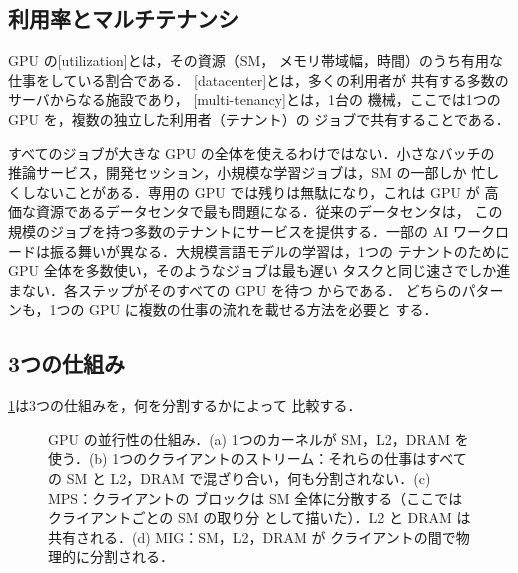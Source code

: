 \documentclass[../main.tex]{subfiles}
\begin{document}
\subsection{利用率とマルチテナンシ}

\begin{definition}
  GPU の[utilization]とは，その資源（SM，
  メモリ帯域幅，時間）のうち有用な仕事をしている割合である．
  [datacenter]とは，多くの利用者が
  共有する多数のサーバからなる施設であり，
  [multi-tenancy]とは，1台の
  機械，ここでは1つの GPU を，複数の独立した利用者（テナント）の
  ジョブで共有することである．
\end{definition}

すべてのジョブが大きな GPU の全体を使えるわけではない．小さなバッチの
推論サービス，開発セッション，小規模な学習ジョブは，SM の一部しか
忙しくしないことがある．専用の GPU では残りは無駄になり，これは GPU が
高価な資源であるデータセンタで最も問題になる．従来のデータセンタは，
この規模のジョブを持つ多数のテナントにサービスを提供する．一部の AI
ワークロードは振る舞いが異なる．大規模言語モデルの学習は，1つの
テナントのために GPU 全体を多数使い，そのようなジョブは最も遅い
タスクと同じ速さでしか進まない．各ステップがそのすべての GPU を待つ
からである．
どちらのパターンも，1つの GPU に複数の仕事の流れを載せる方法を必要と
する．

\subsection{3つの仕組み}

\cref{fig:l09-concurrency}は3つの仕組みを，何を分割するかによって
比較する．

\begin{figure}[tb]
  \centering
  
  \caption{GPU の並行性の仕組み．(a) 1つのカーネルが SM，L2，DRAM を
    使う．(b) 1つのクライアントのストリーム：それらの仕事はすべての SM と
    L2，DRAM で混ざり合い，何も分割されない．(c) MPS：クライアントの
    ブロックは SM 全体に分散する（ここではクライアントごとの SM の取り分
    として描いた）．L2 と DRAM は共有される．(d) MIG：SM，L2，DRAM が
    クライアントの間で物理的に分割される．}
  \label{fig:l09-concurrency}
\end{figure}
\end{document}
